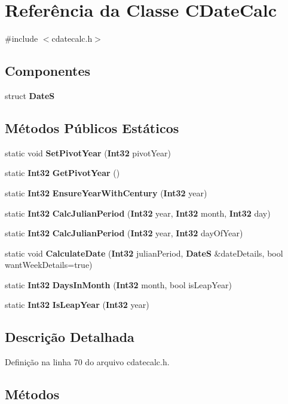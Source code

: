 \section{Referência da Classe C\+Date\+Calc}
\label{class_c_date_calc}


{\ttfamily \#include $<$cdatecalc.\+h$>$}

\subsection*{Componentes}
\begin{DoxyCompactItemize}
\item 
struct {\bf DateS}
\end{DoxyCompactItemize}
\subsection*{Métodos Públicos Estáticos}
\begin{DoxyCompactItemize}
\item 
static void {\bf Set\+Pivot\+Year} ({\bf Int32} pivot\+Year)
\item 
static {\bf Int32} {\bf Get\+Pivot\+Year} ()
\item 
static {\bf Int32} {\bf Ensure\+Year\+With\+Century} ({\bf Int32} year)
\item 
static {\bf Int32} {\bf Calc\+Julian\+Period} ({\bf Int32} year, {\bf Int32} month, {\bf Int32} day)
\item 
static {\bf Int32} {\bf Calc\+Julian\+Period} ({\bf Int32} year, {\bf Int32} day\+Of\+Year)
\item 
static void {\bf Calculate\+Date} ({\bf Int32} julian\+Period, {\bf DateS} \&date\+Details, bool want\+Week\+Details=true)
\item 
static {\bf Int32} {\bf Days\+In\+Month} ({\bf Int32} month, bool is\+Leap\+Year)
\item 
static {\bf Int32} {\bf Is\+Leap\+Year} ({\bf Int32} year)
\end{DoxyCompactItemize}


\subsection{Descrição Detalhada}


Definição na linha 70 do arquivo cdatecalc.\+h.



\subsection{Métodos}
